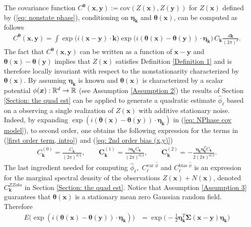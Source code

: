 \documentclass[10pt,noinfoline]{imsart}
\newcommand{\bs}{\boldsymbol}
\begin{document}
  
The covariance function $C^{\bs \theta}(\bs x,\bs y):=\text{cov}(Z(\bs x), Z(\bs y))$ for $Z(\bs x)$ defined by (\ref{eq: nonstate phase}), conditioning on $\bs \eta_{\bs k}$ and $\bs \theta(\bs x)$, can be computed as follows
\begin{align}
\label{eq: NPhase cov model}
C^{\bs \theta}(\bs x,\bs y)=
\int  \exp\big(i(\bs x-\bs y)\cdot \bs k\big)\exp\big( i(\bs\theta(\bs x)-\bs\theta(\bs y)) \cdot \bs\eta_{\bs k}\big)\,C_{\bs k}\frac{d\bs k}{(2\pi)^d} .
\end{align}
The fact that $C^{\bs \theta}(\bs x,\bs y)$ can be written as a function of $\bs x-\bs y$ and $\bs\theta(\bs x)-\bs\theta(\bs y)$ implies that $Z(\bs x)$ satisfies Definition \ref{Definition 1} and is therefore locally invariant with respect to the nonstationarity characterized by $\bs\theta(\bs x)$. By assuming $\bs \eta_{\bs k}$ is known and $\bs \theta(\bs x)$ is characterized by a scalar potential $\phi(\bs x):\Bbb R^d \rightarrow \Bbb R$ (see Assumption \ref{Assumption 2}) the results of Section \ref{Section: the quad est} can be applied to generate a quadratic estimate $\hat\phi_{\bs \ell}$ based on a observing a single realization of $Z(\bs x)$ with additive stationary noise.  Indeed, by expanding $\exp( i(\bs\theta(\bs x)-\bs\theta(\bs y)) \cdot \bs\eta_{\bs k})$ in (\ref{eq: NPhase cov model}), to second order, one obtains the following expression for the terms in (\ref{first order term, intro}) and (\ref{eq: 2nd order bias (x,y)})
\begin{align}
C_{\bs k}^{(0)} =  \frac{C_{\bs k}}{(2\pi)^{d/2}}, \qquad \bs C_{\bs k}^{(1)} = \frac{i  \bs \eta_{\bs k} C_{\bs k}}{(2\pi)^{d/2}},\qquad \bs C_{\bs k}^{(2)} = -\frac{\bs \eta_{\bs k}\bs \eta_{\bs k}^T C_{\bs k}}{2(2\pi)^{d/2}}.\label{eq: C(1), C(2) and C(3) for nonstationary phase}
\end{align}
The last ingredient needed for computing  $\hat\phi_{\bs \ell}$,\, $C_{\bs\ell}^{\text{var }\hat \phi}$ and $C_{\bs \ell}^{\text{bias }\hat \phi}$ is an expression for the marginal spectral density of the observations $Z(\bs x) + N(\bs x)$, denoted $C^{ZZobs}_{\bs k}$ in Section \ref{Section: the quad est}. Notice that  Assumption \ref{Assumption 3} guarantees that $\bs \theta(\bs x)$ is a stationary mean zero Gaussian random field. Therefore
\begin{align*}
E\big(\exp(i (\bs \theta(\bs x) - \bs\theta(\bs y))\cdot \bs \eta_{\bs k})\big)
& = \exp\!\big(\!-\textstyle\frac{1}{2}\bs\eta^T_{\bs k} \bs\Sigma(\bs x-\bs y) \bs \eta_{\bs k}\big)
\end{align*}
\end{document}
